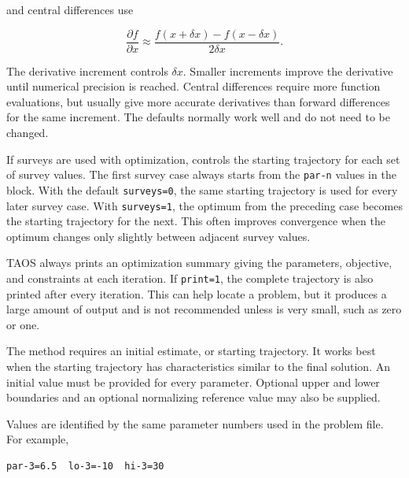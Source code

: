 and central differences use

\begin{equation}
  \frac{\partial f}{\partial x}
  \approx \frac{f(x+\delta x)-f(x-\delta x)}{2\delta x}.
  \label{eq:optimization-central-difference}
\end{equation}

The derivative increment  controls $\delta x$.  Smaller increments
improve the derivative until numerical precision is reached.  Central differences
require more function evaluations, but usually give more accurate derivatives than
forward differences for the same increment.  The defaults normally work well and
do not need to be changed.


If surveys are used with optimization,  controls the starting
trajectory for each set of survey values.  The first survey case always starts from the
\texttt{par-n} values in the  block.  With the default
\texttt{surveys=0}, the same starting trajectory is used for every later survey case.
With \texttt{surveys=1}, the optimum from the preceding case becomes the starting
trajectory for the next.  This often improves convergence when the optimum changes
only slightly between adjacent survey values.


TAOS always prints an optimization summary giving the parameters, objective, and
constraints at each iteration.  If \texttt{print=1}, the complete trajectory is also
printed after every iteration.  This can help locate a problem, but it produces a large
amount of output and is not recommended unless  is very small,
such as zero or one.


The method requires an initial estimate, or starting trajectory.  It works best when
the starting trajectory has characteristics similar to the final solution.  An initial
value must be provided for every parameter.  Optional upper and lower boundaries
and an optional normalizing reference value may also be supplied.

Values are identified by the same parameter numbers used in the problem file.  For
example,

\begin{lstlisting}[style=taosmanual]
par-3=6.5  lo-3=-10  hi-3=30
\end{lstlisting}

